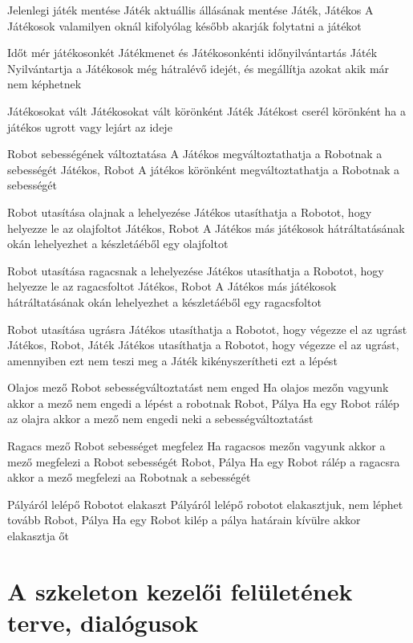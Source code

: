 \usecase%
{Jelenlegi játék mentése}%
{Játék aktuállis állásának mentése}%
{Játék, Játékos}%
{A Játékosok valamilyen oknál kifolyólag később akarják folytatni a játékot}

\usecase%
{Időt mér játékosonkét}%
{Játékmenet és Játékosonkénti időnyilvántartás}%
{Játék}%
{Nyilvántartja a Játékosok még hátralévő idejét, és megállítja azokat akik már nem képhetnek}

\usecase%
{Játékosokat vált}%
{Játékosokat vált körönként}%
{Játék}%
{Játékost cserél körönként ha a játékos ugrott vagy lejárt az ideje}

\usecase%
{Robot sebességének változtatása}%
{A Játékos megváltoztathatja a Robotnak a sebességét}%
{Játékos, Robot}%
{A játékos körönként megváltoztathatja a Robotnak a sebességét}

\usecase%
{Robot utasítása olajnak a lehelyezése}%
{Játékos utasíthatja a Robotot, hogy helyezze le az olajfoltot}%
{Játékos, Robot}%
{A Játékos más játékosok hátráltatásának okán lehelyezhet a készletáéből egy olajfoltot}

\usecase%
{Robot utasítása ragacsnak a lehelyezése}%
{Játékos utasíthatja a Robotot, hogy helyezze le az ragacsfoltot}%
{Játékos, Robot}%
{A Játékos más játékosok hátráltatásának okán lehelyezhet a készletáéből egy ragacsfoltot}

\usecase%
{Robot utasítása ugrásra}%
{Játékos utasíthatja a Robotot, hogy végezze el az ugrást}%
{Játékos, Robot, Játék}%
{Játékos utasíthatja a Robotot, hogy végezze el az ugrást, amennyiben ezt nem teszi meg a Játék kikényszerítheti ezt a lépést}

\usecase%
{Olajos mező Robot sebességváltoztatást nem enged}%
{Ha olajos mezőn vagyunk akkor a mező nem engedi a lépést a robotnak}%
{Robot, Pálya}%
{Ha egy Robot rálép az olajra akkor a mező nem engedi neki a sebességváltoztatást}

\usecase%
{Ragacs mező Robot sebességet megfelez}%
{Ha ragacsos mezőn vagyunk akkor a mező megfelezi a Robot sebességét}%
{Robot, Pálya}%
{Ha egy Robot rálép a ragacsra akkor a mező megfelezi aa Robotnak a sebességét}

\usecase%
{Pályáról lelépő Robotot elakaszt}%
{Pályáról lelépő robotot elakasztjuk, nem léphet tovább}%
{Robot, Pálya}%
{Ha egy Robot kilép a pálya határain kívülre akkor elakasztja őt}

\section{A szkeleton kezelői felületének terve, dialógusok}

